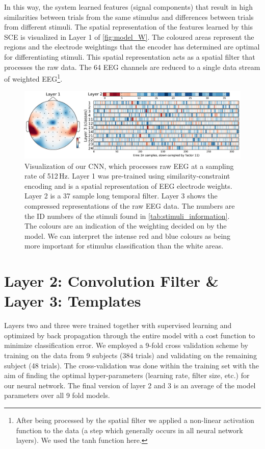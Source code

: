 In this way, the system learned features (signal components) that result in high similarities between trials from the same stimulus and differences between trials from different stimuli.  
The spatial representation of the features learned by this \ac{SCE} is visualized in Layer 1 of \autoref{fig:model_W}. 
The coloured areas represent the regions and the electrode weightings that the encoder has determined are optimal for differentiating stimuli.
This spatial representation acts as a spatial filter that processes the raw data.
The 64 EEG channels are reduced to a single data stream of weighted EEG\footnote{After being processed by the spatial filter we applied a non-linear activation function to the data (a step which generally occurs in all neural network layers).
We used the tanh function here.}. 
\begin{figure}[h] 
  \begin{center}
    \includegraphics[width=\textwidth,keepaspectratio=true]{Figures/model_W}
    \caption{Visualization of our \ac{CNN}, which processes raw EEG at a sampling rate of 512\,Hz.
    Layer 1 was pre-trained using similarity-constraint encoding and is a spatial representation of EEG electrode weights. Layer 2 is a 37 sample long temporal filter. Layer 3 shows the compressed representations of the raw EEG data. The numbers are the ID numbers of the stimuli found in \autoref{tab:stimuli_information}. The colours are an indication of the weighting decided on by the model. We can interpret the intense red and blue colours as being more important for stimulus classification than the white areas.}
    \label{fig:model_W}
  \end{center}
\end{figure}
\section{Layer 2: Convolution Filter \& Layer 3: Templates}
Layers two and three were trained together with supervised learning and optimized by back propagation through the entire model with a cost function to minimize classification error.
We employed a 9-fold cross validation scheme by training on the data from 9 subjects (384 trials) and validating on the remaining subject (48 trials).
The cross-validation was done within the training set with the aim of finding the optimal hyper-parameters (learning rate, filter size, etc.) for our neural network. 
The final version of layer 2 and 3 is an average of the model parameters over all 9 fold models.
